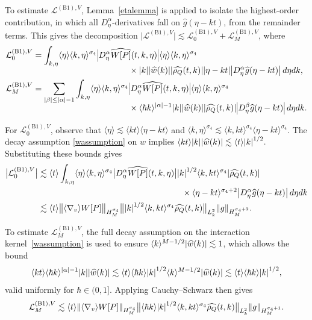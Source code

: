\documentclass[JEP,XML,SOM,Unicode]{cedram}
\newcommand{\bnorm}[1]{\bigl\|#1\bigr\|}
\newcommand{\babs}[1]{\bigl|#1\bigr|}
\theoremstyle{plain}
\theoremstyle{remark}
\newcommand\pig[1]{\scalerel*[2.35pt]{\big#1}{%
\ensurestackMath{\addstackgap[1.2pt]{\big#1}}}}
\newcommand\pigl[1]{\mathopen{\pig{#1}}}
\newcommand\pigr[1]{\mathclose{\pig{#1}}}
\newcommand{\ak}{\abs{k}}
\newcommand{\aal}{\abs{\alpha}}
\newcommand{\jb}[1]{\langle#1\rangle}
\begin{document}
To estimate \(\mathcal{L}^{\mathrm{(B1)},V}\), Lemma~\ref{etalemma} is applied to isolate the highest-order contribution, in which all \( D_\eta^\alpha \)-derivatives fall on \(\widehat{g}(\eta - kt)\), from the remainder terms. This gives the decomposition $\babs{\mathcal{L}^{\mathrm{(B1)},V}}\lesssim \mathcal{L}_0^{\mathrm{(B1)},V} + \mathcal{L}_M^{\mathrm{(B1)},V}$, where
\begin{align*}
\mathcal{L}_0^{\mathrm{(B1)},V}&=\int_{k,\eta}\jb{\eta}\jb{k,\eta}^{\sigma_4} \pigl|D_\eta^\alpha \widehat{W[P]}(t,k,\eta)\pigr|\jb{\eta}\jb{k,\eta}^{\sigma_4} \\[-5pt]
&\hspace{4cm}\times\ak\abs{\widehat w(k)}\abs{\widehat{\rho_Q}(t,k)}\abs{\eta-kt}\babs{D^\alpha_\eta\widehat g(\eta-kt)}\,d\eta dk,\\
\mathcal{L}_M^{\mathrm{(B1)},V}&=\sum_{\abs{\beta}\leq \aal-1}\int_{k,\eta}\jb{\eta}\jb{k,\eta}^{\sigma_4} \pigl|D_\eta^\alpha \widehat{W[P]}(t,k,\eta)\pigr|\jb{\eta}\jb{k,\eta}^{\sigma_4}\\[-6pt]
&\hspace{4cm}\times\jb{\hbar k}^{\abs{\alpha}-1}\ak\abs{\widehat w(k)}\abs{\widehat{\rho_Q}(t,k)}\pigl|{D^\beta_\eta\widehat g(\eta-kt)}\pigr|\,d\eta dk.
\end{align*}

For \(\mathcal{L}_0^{\mathrm{(B1)},V}\), observe that \(\jb{\eta} \lesssim \jb{kt} \jb{\eta - kt}\) and \(\jb{k,\eta}^{\sigma_4} \lesssim \jb{k,kt}^{\sigma_4} \jb{\eta - kt}^{\sigma_4}\). The decay assumption \eqref{wassumption} on \(w\) implies $\jb{kt} \ak \abs{\widehat{w}(k)} \lesssim \jb{t} \ak^{1/2}.$ Substituting these bounds gives
\begin{align*}
\babs{\mathcal{L}_0^{\mathrm{(B1)},V}}&\lesssim\jb{t}\int_{k,\eta}\jb{\eta}\jb{k,\eta}^{\sigma_4} \babs{D_\eta^\alpha \widehat{W[P]}(t,k,\eta)}\ak^{1/2}\jb{k,kt}^{\sigma_4}\abs{\widehat{\rho_Q}(t,k)}\\
&\hspace{6cm}\times\jb{\eta-kt}^{\sigma_4+2}\abs{D^\alpha_\eta\widehat g(\eta-kt)}\,d\eta dk\\
&\lesssim\jb{t}\bnorm{\jb{\nabla_v}W[P]}_{H^{\sigma_4}_M}\bnorm{\ak^{1/2}\jb{k,kt}^{\sigma_4}\widehat{\rho_Q}(t,k)}_{L^2_{k}}\norm{g}_{H^{\sigma_4+2}_M}.
\end{align*}

To estimate \(\mathcal{L}_M^{\mathrm{(B1)},V}\), the full decay assumption on the interaction kernel~\eqref{wassumption} is used to ensure \(\jb{k}^{M - 1/2} \abs{\widehat{w}(k)} \lesssim 1\), which allows the bound
\[
\jb{kt} \jb{\hbar k}^{\abs{\alpha} - 1} \abs{k}\abs{\widehat w(k)} \lesssim \jb{t} \jb{\hbar k} \ak^{1/2} \jb{k}^{M - 1/2}\abs{\widehat w(k)} \lesssim\jb{t} \jb{\hbar k} \ak^{1/2},
\]
valid uniformly for \(\hbar \in (0,1]\). Applying Cauchy--Schwarz then gives
\begin{align*}
\mathcal{L}_M^{\mathrm{(B1)},V}\lesssim\jb{t}\norm{\jb{\nabla_v}W[P]}_{H^{\sigma_4}_M}\bnorm{\jb{\hbar k}\ak^{1/2}\jb{k,kt}^{\sigma_4}\widehat{\rho_Q}(t,k)}_{L^2_{k}}\norm{g}_{H^{\sigma_4+1}_M}.
\end{align*}
\end{document}
